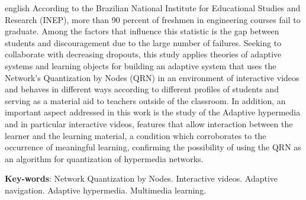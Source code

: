 \begin{resumo}[Abstract]
 \begin{otherlanguage*}{english}
According to the Brazilian National Institute for Educational Studies and Research (INEP), more than 90 percent of freshmen in engineering courses fail to graduate. Among the factors that influence this statistic is the gap between students and discouragement due to the large number of failures. Seeking to collaborate with decreasing dropouts, this study applies theories of adaptive systems and learning objects for building an adaptive system that uses the Network's Quantization by Nodes (QRN) in an environment of interactive videos and behaves in different ways according to different profiles of students and serving as a material aid to teachers outside of the classroom. In addition, an important aspect addressed in this work is the study of the Adaptive hypermedia and in particular interactive videos, features that allow interaction between the learner and the learning material, a condition which corroborates to the occurrence of meaningful learning, confirming the possibility of using the QRN as an algorithm for quantization of hypermedia networks.

   \vspace{\onelineskip}
 
   \noindent 
   \textbf{Key-words}: Network Quantization by Nodes. Interactive videos. Adaptive navigation. Adaptive hypermedia. Multimedia learning.
 \end{otherlanguage*}
\end{resumo}
